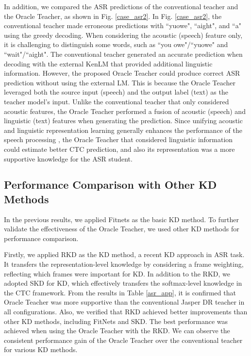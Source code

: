 \documentclass[journal]{IEEEtran}
\begin{document}
In addition, we compared the ASR predictions of the conventional teacher and the Oracle Teacher, as shown in Fig. \ref{case_asr2}.
In Fig. \ref{case_asr2}, the conventional teacher made erroneous predictions with ``yuowe", ``aight", and ``a" using the greedy decoding.
When considering the acoustic (speech) feature only, it is challenging to distinguish some words, such as ``you owe"/``yuowe" and ``wait"/``aight".
The conventional teacher generated an accurate prediction when decoding with the external KenLM that provided additional linguistic information.
However, the proposed Oracle Teacher could produce correct ASR prediction without using the external LM.
This is because the Oracle Teacher leveraged both the source input (speech) and the output label (text) as the teacher model's input.
Unlike the conventional teacher that only considered acoustic features, the Oracle Teacher performed a fusion of acoustic (speech) and linguistic (text) features when generating the prediction.
Since unifying acoustic and linguistic representation learning generally enhances the performance of the speech processing \cite{acours_lin1,acours_lin2,acours_lin3,acours_lin4,acours_lin5}, the Oracle Teacher that considered linguistic information could estimate better CTC prediction, and also its representation was a more supportive knowledge for the ASR student.


\subsection{Performance Comparison with Other KD Methods}
In the previous results, we applied Fitnets \cite{romero-et-al:scheme} as the basic KD method. To further validate the effectiveness of the Oracle Teacher, we used other KD methods for performance comparison.


Firstly, we applied RKD \cite{tutornet:scheme} as the KD method, a recent KD approach in ASR task. It transfers the representation-level knowledge by considering a frame weighting, reflecting which frames were important for KD. 
In addition to the RKD, we adopted SKD \cite{tutornet:scheme} for KD, which effectively transfers the softmax-level knowledge in the CTC framework.
From the results in Table \ref{asr_app}, it is confirmed that Oracle Teacher was more supportive than the conventional Jasper DR teacher in all configurations.
Also, we verified that RKD achieved better improvements than other KD methods, including FitNets and SKD. The best performance was achieved when using the Oracle Teacher with the RKD. We can observe the consistent performance gain of the Oracle Teacher over the conventional teacher for various KD methods.
\end{document}
